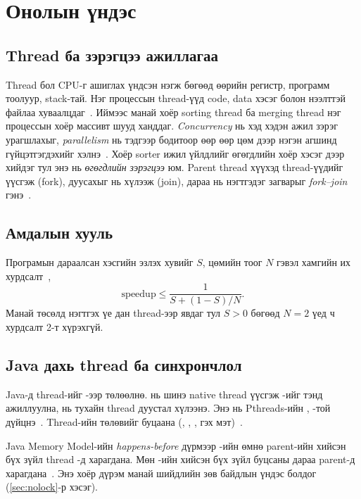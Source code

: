 \chapter{Онолын үндэс}\label{ch:theory}

\section{Thread ба зэрэгцээ ажиллагаа}
Thread бол CPU-г ашиглах үндсэн нэгж бөгөөд өөрийн регистр, программ тоолуур, stack-тай. Нэг процессын
thread-үүд code, data хэсэг болон нээлттэй файлаа хуваалцдаг~\cite[4.1]{osc10}. Иймээс манай хоёр sorting thread
ба merging thread нэг процессын хоёр массивт шууд ханддаг. \emph{Concurrency} нь хэд хэдэн ажил зэрэг урагшлахыг,
\emph{parallelism} нь тэдгээр бодитоор өөр өөр цөм дээр нэгэн агшинд гүйцэтгэгдэхийг хэлнэ~\cite[4.2]{osc10}.
Хоёр sorter ижил үйлдлийг өгөгдлийн хоёр хэсэг дээр хийдэг тул энэ нь \emph{өгөгдлийн зэрэгцээ} юм. Parent
thread хүүхэд thread-үүдийг үүсгэж (fork), дуусахыг нь хүлээж (join), дараа нь нэгтгэдэг загварыг
\emph{fork--join} гэнэ~\cite[4.5.2]{osc10}.

\section{Амдалын хууль}
Програмын дараалсан хэсгийн эзлэх хувийг $S$, цөмийн тоог $N$ гэвэл хамгийн их хурдсалт~\cite[4.2]{osc10}, \cite{amdahl67}
\begin{equation}
  \text{speedup} \le \frac{1}{S + (1-S)/N}.
  \label{eq:amdahl}
\end{equation}
Манай төсөлд нэгтгэх үе дан thread-ээр явдаг тул $S > 0$ бөгөөд $N = 2$ үед ч хурдсалт 2-т хүрэхгүй.

\section{Java дахь thread ба синхрончлол}
Java-д thread-ийг -ээр төлөөлнө.  нь шинэ native thread үүсгэж -ийг
тэнд ажиллуулна,  нь тухайн thread дуустал хүлээнэ. Энэ нь Pthreads-ийн ,
-той дүйцнэ~\cite[4.4]{osc10}. Thread-ийн төлөвийг  буцаана
(, , ,  гэх мэт)~\cite{javadoc-thread}.

Java Memory Model-ийн \emph{happens-before} дүрмээр -ийн өмнө parent-ийн хийсэн бүх зүйл thread
-д харагдана. Мөн -ийн хийсэн бүх зүйл  буцсаны дараа parent-д харагдана~\cite{jls17,goetz}.
Энэ хоёр дүрэм манай шийдлийн зөв байдлын үндэс болдог (\ref{sec:nolock}-р хэсэг).

